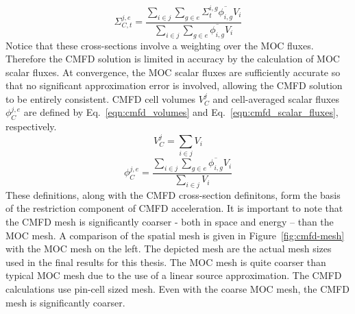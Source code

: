 \begin{equation}
	\Sigma_{C,t}^{j, e} = \frac{\sum_{i \in j} \sum_{g \in e} \Sigma_{t}^{i, g} \overline{\phi_{i,g}} V_i}{\sum_{i \in j} \sum_{g\in e} \overline{\phi_{i,g}} V_i}
\end{equation}
Notice that these cross-sections involve a weighting over the MOC fluxes. Therefore the CMFD solution is limited in accuracy by the calculation of MOC scalar fluxes. At convergence, the MOC scalar fluxes are sufficiently accurate so that no significant approximation error is involved, allowing the CMFD solution to be entirely consistent. CMFD cell volumes $V_C^j$ and cell-averaged scalar fluxes $\phi_C^{j,e}$ are defined by Eq.~\ref{eqn:cmfd_volumes} and Eq.~\ref{eqn:cmfd_scalar_fluxes}, respectively.
\begin{equation}
	V_C^j = \sum_{i \in j} V_i
	\label{eqn:cmfd_volumes}
\end{equation}
\begin{equation}
\phi_C^{j,e} = \frac{\sum_{i \in j} \sum_{g \in e} \overline{\phi_{i,g}} V_i}{\sum_{i \in j} V_i}
\label{eqn:cmfd_scalar_fluxes}
\end{equation}
These definitions, along with the CMFD cross-section definitons, form the basis of the restriction component of CMFD acceleration. It is important to note that the CMFD mesh is significantly coarser - both in space and energy -- than the MOC mesh. A comparison of the spatial mesh is given in Figure~\ref{fig:cmfd-mesh} with the MOC mesh on the left. The depicted mesh are the actual mesh sizes used in the final results for this thesis. The MOC mesh is quite coarser than typical MOC mesh due to the use of a linear source approximation. The CMFD calculations use pin-cell sized mesh. Even with the coarse MOC mesh, the CMFD mesh is significantly coarser.
